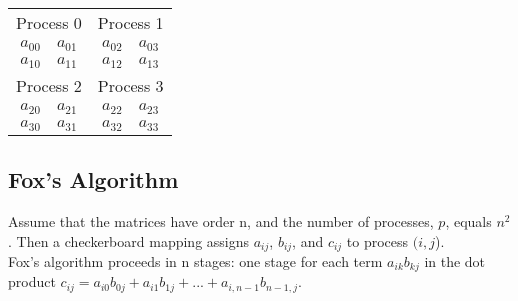 \documentclass[]{scrartcl}
\begin{document}
\begin{center}
	\begin{tabular}{|c|c|} 
		\hline
		Process 0 & Process 1 \\
		$a_{00} \quad a_{01}$ &   $a_{02} \quad a_{03}$ \\
		$a_{10} \quad a_{11}$ &	  $a_{12} \quad a_{13}$ \\ 
		Process 2 & Process 3 \\
		$a_{20} \quad a_{21}$ &	  $a_{22} \quad a_{23}$ \\
		$a_{30} \quad a_{31}$ &	  $a_{32} \quad a_{33}$ \\ 
		\hline
	\end{tabular}
\end{center}

\subsection{Fox's Algorithm}
Assume that the matrices have order n, and the number of processes, $p$, equals $n^{2}$. Then a checkerboard mapping assigns $a_{ij}$, $b_{ij}$, and $c_{ij}$ to process $(i,j$). \\ Fox's algorithm proceeds in n stages: one stage for each term $a_{ik}b_{kj}$ in the dot product $c_{ij}=a_{i0}b_{0j}+a_{i1}b_{1j}+...+a_{i,n-1}b_{n-1,j}$. \\
\end{document}
